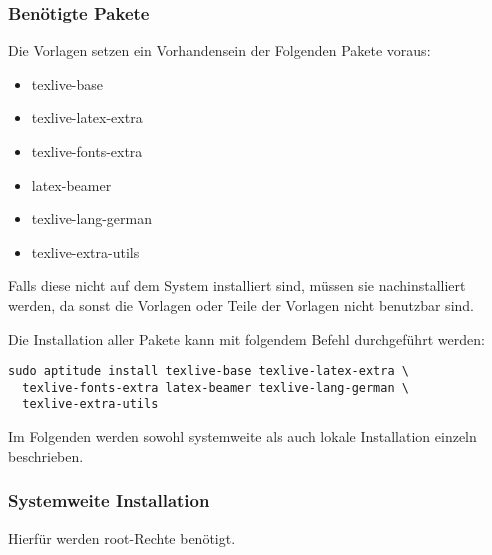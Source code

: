 \subsubsection{Benötigte Pakete}

Die Vorlagen setzen ein Vorhandensein der Folgenden Pakete voraus:

\begin{itemize}
  \item texlive-base
  \item texlive-latex-extra
  \item texlive-fonts-extra
  \item latex-beamer
  \item texlive-lang-german
  \item texlive-extra-utils
\end{itemize}

Falls diese nicht auf dem System installiert sind, müssen sie nachinstalliert
werden, da sonst die Vorlagen oder Teile der Vorlagen nicht benutzbar sind.

Die Installation aller Pakete kann mit folgendem Befehl durchgeführt werden:
\begin{lstlisting}[style=cmd]
sudo aptitude install texlive-base texlive-latex-extra \
  texlive-fonts-extra latex-beamer texlive-lang-german \
  texlive-extra-utils
\end{lstlisting}

Im Folgenden werden sowohl systemweite als auch lokale Installation einzeln
beschrieben.

\subsubsection{Systemweite Installation}

\begin{important}
  Hierfür werden root-Rechte benötigt.
\end{important}

